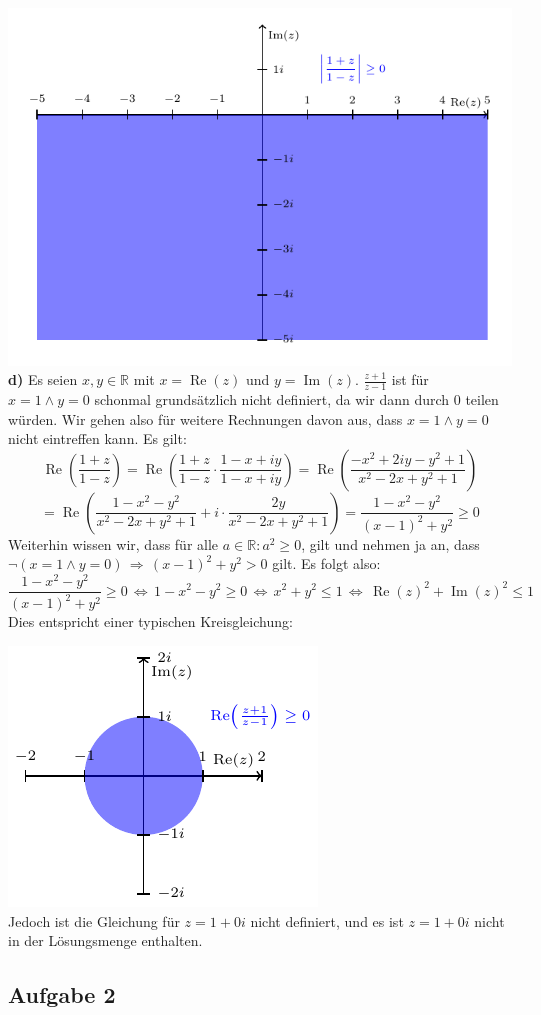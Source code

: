 \documentclass[a4paper,graphics,11pt]{article}
\newcommand{\aufgabe}[1]{\subsection*{Aufgabe #1}}
\newcommand{\re}{\operatorname{Re}}
\newcommand{\im}{\operatorname{Im}}
\begin{document}
\newpage
\qquad\qquad\qquad\includegraphics{graphics/graph5.pdf}\\
\textbf{d)}
Es seien $x,y \in \mathbb{R}$ mit $x=\re(z)$ und $y=\im(z)$.
$\frac{z+1}{z-1}$ ist für $x=1 \land y=0$ schonmal grundsätzlich nicht definiert, da wir
dann durch 0 teilen würden. Wir gehen also für weitere Rechnungen davon aus, dass
$x=1 \land y=0$ nicht eintreffen kann. Es gilt:
$$
    \re\left(\frac{1+z}{1-z}\right)
    = \re\left(\frac{1+z}{1-z} \cdot \frac{1-x+iy}{1-x+iy}\right)
    = \re\left(\frac{-x^2+2iy-y^2+1}{x^2-2x+y^2+1}\right)
$$$$
    = \re\left(\frac{1-x^2-y^2}{x^2-2x+y^2+1} + i\cdot \frac{2y}{x^2-2x+y^2+1}\right)
    = \frac{1-x^2-y^2}{(x-1)^2+y^2} \geq 0
$$
Weiterhin wissen wir, dass für alle $a \in \mathbb{R}\colon a^2 \geq 0$, gilt und nehmen ja
an, dass\\
$\lnot(x = 1 \land y = 0) \,\Longrightarrow\, (x-1)^2+y^2 > 0$ gilt. Es folgt also:
$$
    \frac{1-x^2-y^2}{(x-1)^2+y^2} \geq 0
    \,\Longleftrightarrow\, 1-x^2-y^2 \geq 0
    \,\Longleftrightarrow\, x^2+y^2 \leq 1
    \,\Longleftrightarrow\, \re(z)^2+\im(z)^2 \leq 1
$$
Dies entspricht einer typischen Kreisgleichung:\\
\strut\qquad\qquad\qquad\qquad\qquad\qquad\includegraphics[scale=1.5]{graphics/graph0.pdf}\\
Jedoch ist die Gleichung für $z = 1+0i$ nicht definiert, und es ist $z = 1+0i$ nicht in
der Lösungsmenge enthalten.
\newpage
\aufgabe{2}
\end{document}
